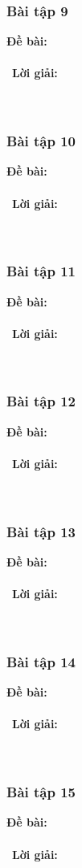\documentclass[a4paper]{article}
\begin{document}
\subsubsection{Bài tập 9}
\textbf{Đề bài:} 
\\\ \\\
\textbf{Lời giải:} \\\ \\\
\clearpage
\subsubsection{Bài tập 10}
\textbf{Đề bài:} 
\\\ \\\
\textbf{Lời giải:} \\\ \\\
\clearpage
\subsubsection{Bài tập 11}
\textbf{Đề bài:} 
\\\ \\\
\textbf{Lời giải:} \\\ \\\
\clearpage
\subsubsection{Bài tập 12}
\textbf{Đề bài:} 
\\\ \\\
\textbf{Lời giải:} \\\ \\\
\clearpage
\subsubsection{Bài tập 13}
\textbf{Đề bài:} 
\\\ \\\
\textbf{Lời giải:} \\\ \\\
\clearpage
\subsubsection{Bài tập 14}
\textbf{Đề bài:} 
\\\ \\\
\textbf{Lời giải:} \\\ \\\
\clearpage
\subsubsection{Bài tập 15}
\textbf{Đề bài:} 
\\\ \\\
\textbf{Lời giải:} \\\ \\\
\clearpage
\end{document}
